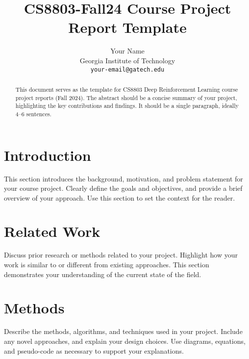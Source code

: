 \documentclass{article}
\title{CS8803-Fall24 Course Project Report Template}
\author{
  Your Name \\
  Georgia Institute of Technology\\
  \texttt{your-email@gatech.edu} \\
}
\begin{document}
\maketitle


\begin{abstract}
    This document serves as the template for CS8803 Deep Reinforcement Learning course project reports (Fall 2024). The abstract should be a concise summary of your project, highlighting the key contributions and findings. It should be a single paragraph, ideally 4--6 sentences.
\end{abstract}



\section{Introduction}
\label{sec:introduction}
    
    This section introduces the background, motivation, and problem statement for your course project. Clearly define the goals and objectives, and provide a brief overview of your approach. Use this section to set the context for the reader.


\section{Related Work}
\label{sec:related-work}

    Discuss prior research or methods related to your project. Highlight how your work is similar to or different from existing approaches. This section demonstrates your understanding of the current state of the field.


\section{Methods}
\label{sec:methods}

    Describe the methods, algorithms, and techniques used in your project. Include any novel approaches, and explain your design choices. Use diagrams, equations, and pseudo-code as necessary to support your explanations.
\end{document}
